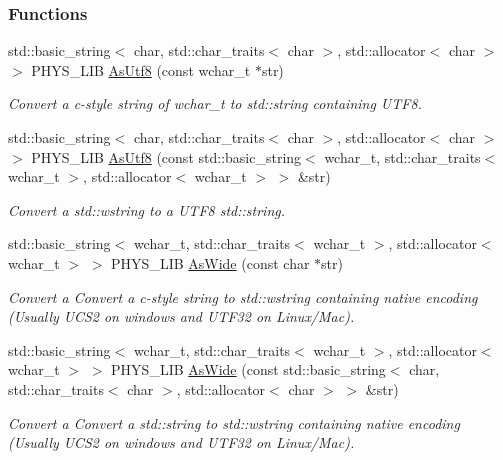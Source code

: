 \subsubsection*{Functions}
\begin{DoxyCompactItemize}
\item 
std::basic\_\-string$<$ char, std::char\_\-traits$<$ char $>$, std::allocator$<$ char $>$ $>$ PHYS\_\-LIB \hyperlink{namespacephys_1_1xml_a2d4bf28045544dc7350827f568cad46f}{AsUtf8} (const wchar\_\-t $\ast$str)
\begin{DoxyCompactList}\small\item\em Convert a c-\/style string of wchar\_\-t to std::string containing UTF8. \item\end{DoxyCompactList}\item 
std::basic\_\-string$<$ char, std::char\_\-traits$<$ char $>$, std::allocator$<$ char $>$ $>$ PHYS\_\-LIB \hyperlink{namespacephys_1_1xml_aa3d160a2965f60bc3b2f019be6c7d038}{AsUtf8} (const std::basic\_\-string$<$ wchar\_\-t, std::char\_\-traits$<$ wchar\_\-t $>$, std::allocator$<$ wchar\_\-t $>$ $>$ \&str)
\begin{DoxyCompactList}\small\item\em Convert a std::wstring to a UTF8 std::string. \item\end{DoxyCompactList}\item 
std::basic\_\-string$<$ wchar\_\-t, std::char\_\-traits$<$ wchar\_\-t $>$, std::allocator$<$ wchar\_\-t $>$ $>$ PHYS\_\-LIB \hyperlink{namespacephys_1_1xml_a0a57ef612f499a03733ca18d0e4f0c4f}{AsWide} (const char $\ast$str)
\begin{DoxyCompactList}\small\item\em Convert a Convert a c-\/style string to std::wstring containing native encoding (Usually UCS2 on windows and UTF32 on Linux/Mac). \item\end{DoxyCompactList}\item 
std::basic\_\-string$<$ wchar\_\-t, std::char\_\-traits$<$ wchar\_\-t $>$, std::allocator$<$ wchar\_\-t $>$ $>$ PHYS\_\-LIB \hyperlink{namespacephys_1_1xml_a7ca79461d40476ea4cde4f54dadffff4}{AsWide} (const std::basic\_\-string$<$ char, std::char\_\-traits$<$ char $>$, std::allocator$<$ char $>$ $>$ \&str)
\begin{DoxyCompactList}\small\item\em Convert a Convert a std::string to std::wstring containing native encoding (Usually UCS2 on windows and UTF32 on Linux/Mac). \item\end{DoxyCompactList}\item 

\end{DoxyCompactItemize}
